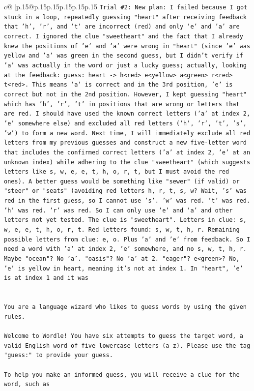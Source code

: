 \documentclass{article}
\begin{document}
{\begin{supertabular}{c@{$\;$}|p{.15\linewidth}@{}p{.15\linewidth}p{.15\linewidth}p{.15\linewidth}p{.15\linewidth}p{.15\linewidth}}
{{{\texttt{Trial \#2: New plan: I failed because I got stuck in a loop, repeatedly guessing "heart" after receiving feedback that 'h', 'r', and 't' are incorrect (red) and only 'e' and 'a' are correct. I ignored the clue "sweetheart" and the fact that I already knew the positions of 'e' and 'a' were wrong in "heart" (since 'e' was yellow and 'a' was green in the second guess, but I didn't verify if 'a' was actually in the word or just a lucky guess; actually, looking at the feedback: guess: heart {-}> h<red> e<yellow> a<green> r<red> t<red>. This means 'a' is correct and in the 3rd position, 'e' is correct but not in the 2nd position. However, I kept guessing "heart" which has 'h', 'r', 't' in positions that are wrong or letters that are red. I should have used the known correct letters ('a' at index 2, 'e' somewhere else) and excluded all red letters ('h', 'r', 't', 's', 'w') to form a new word. Next time, I will immediately exclude all red letters from my previous guesses and construct a new five{-}letter word that includes the confirmed correct letters ('a' at index 2, 'e' at an unknown index) while adhering to the clue "sweetheart" (which suggests letters like s, w, e, e, t, h, o, r, t, but I must avoid the red ones). A better guess would be something like "sewer" (if valid) or "steer" or "seats" (avoiding red letters h, r, t, s, w? Wait, 's' was red in the first guess, so I cannot use 's'. 'w' was red. 't' was red. 'h' was red. 'r' was red. So I can only use 'e' and 'a' and other letters not yet tested. The clue is "sweetheart". Letters in clue: s, w, e, e, t, h, o, r, t. Red letters found: s, w, t, h, r. Remaining possible letters from clue: e, o. Plus 'a' and 'e' from feedback. So I need a word with 'a' at index 2, 'e' somewhere, and no s, w, t, h, r. Maybe "ocean"? No 'a'. "oasis"? No 'a' at 2. "eager"? e<green>? No, 'e' is yellow in heart, meaning it's not at index 1. In "heart", 'e' is at index 1 and it was} \\
\\ 
\\ 
\texttt{You are a language wizard who likes to guess words by using the given rules.} \\
\\ 
\texttt{Welcome to Wordle! You have six attempts to guess the target word, a valid English word of five lowercase letters (a{-}z). Please use the tag "guess:" to provide your guess.} \\
\\ 
\texttt{To help you make an informed guess, you will receive a clue for the word, such as} \\
}}}
\end{supertabular}}
\end{document}
